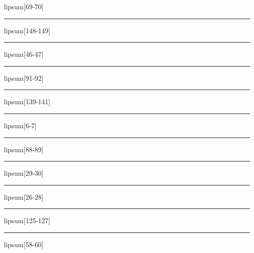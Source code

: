 \documentclass[11pt,a4paper]{article}
\begin{document}
lipsum[69-70]

\begin{simplewrap}
  \textcolor{magenta!60}{\rule{5.8cm}{2.4cm}}
\end{simplewrap}
lipsum[148-149]

\begin{simplewrap}
  \textcolor{pink!32}{\rule{5.8cm}{9.9cm}}
\end{simplewrap}
lipsum[46-47]

\begin{simplewrap}
  \textcolor{brown!57}{\rule{5.1cm}{9.3cm}}
\end{simplewrap}
lipsum[91-92]

\begin{simplewrap}
  \textcolor{purple!46}{\rule{5.8cm}{8.7cm}}
\end{simplewrap}
lipsum[139-141]

\begin{simplewrap}
  \textcolor{red!12}{\rule{3.3cm}{3.9cm}}
\end{simplewrap}
lipsum[6-7]

\begin{simplewrap}
  \textcolor{red!31}{\rule{5.8cm}{3.6cm}}
\end{simplewrap}
lipsum[88-89]

\begin{simplewrap}
  \textcolor{brown!13}{\rule{3.1cm}{6.7cm}}
\end{simplewrap}
lipsum[29-30]

\begin{simplewrap}
  \textcolor{lime!14}{\rule{4.1cm}{9.5cm}}
\end{simplewrap}
lipsum[26-28]

\begin{simplewrap}
  \textcolor{brown!18}{\rule{5.9cm}{7.9cm}}
\end{simplewrap}
lipsum[125-127]

\begin{simplewrap}
  \textcolor{cyan!55}{\rule{5.9cm}{7.5cm}}
\end{simplewrap}
lipsum[58-60]
\end{document}
